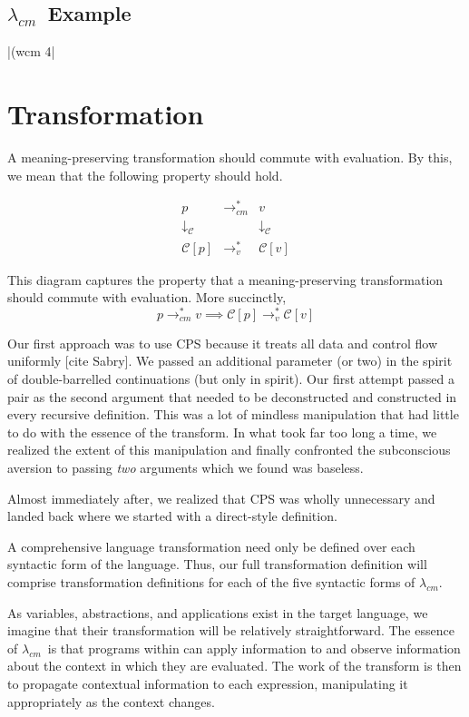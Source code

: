 \documentclass{llncs}
\newcommand{\cm}[0]{$\lambda_{cm}$}
\newcommand{\lvrrs}[0]{\rightarrow_v^{*}}
\newcommand{\cmrrs}[0]{\rightarrow_{cm}^{*}}
\newcommand{\C}[1]{\mathcal{C}[#1]}
\begin{document}
\subsection{\cm\ Example}

\scheme|(wcm 4|

\section{Transformation}

A meaning-preserving transformation should commute with evaluation. By this, we mean that the following property should hold.

\[
\begin{array}{ccc}
p & \cmrrs & v\\
\downarrow_\mathcal{C} & & \downarrow_\mathcal{C}\\
\C{p} & \lvrrs & \C{v}
\end{array}
\]

This diagram captures the property that a meaning-preserving transformation should commute with evaluation. More succinctly, 
\begin{equation}
\label{meaning-preservation-property}
p\cmrrs v\implies\C{p}\lvrrs\C{v}
\end{equation}

Our first approach was to use CPS because it treats all data and control flow uniformly [cite Sabry]. We passed an additional parameter (or two) in the spirit of double-barrelled continuations (but only in spirit). Our first attempt passed a pair as the second argument that needed to be deconstructed and constructed in every recursive definition. This was a lot of mindless manipulation that had little to do with the essence of the transform. In what took far too long a time, we realized the extent of this manipulation and finally confronted the subconscious aversion to passing \emph{two} arguments which we found was baseless.

Almost immediately after, we realized that CPS was wholly unnecessary and landed back where we started with a direct-style definition.


A comprehensive language transformation need only be defined over each syntactic form of the language. Thus, our full transformation definition will comprise transformation definitions for each of the five syntactic forms of \cm.

As variables, abstractions, and applications exist in the target language, we imagine that their transformation will be relatively straightforward. The essence of \cm\ is that programs within can apply information to and observe information about the context in which they are evaluated. The work of the transform is then to propagate contextual information to each expression, manipulating it appropriately as the context changes.
\end{document}
